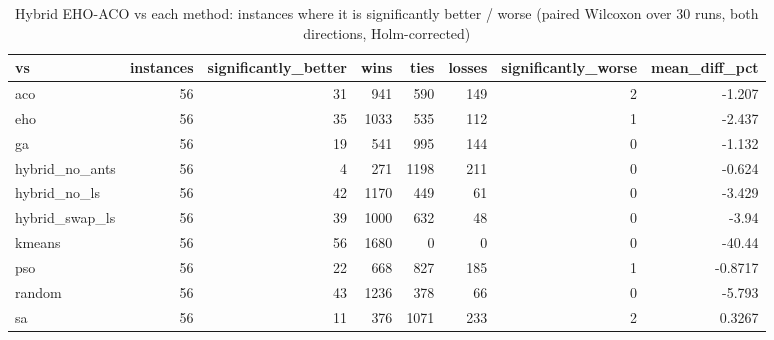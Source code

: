 \begin{table}
\caption{Hybrid EHO-ACO vs each method: instances where it is significantly better / worse (paired Wilcoxon over 30 runs, both directions, Holm-corrected)}
\begin{tabular}{lrrrrrrr}
\toprule
vs & instances & significantly_better & wins & ties & losses & significantly_worse & mean_diff_pct \\
\midrule
aco & 56 & 31 & 941 & 590 & 149 & 2 & -1.207 \\
eho & 56 & 35 & 1033 & 535 & 112 & 1 & -2.437 \\
ga & 56 & 19 & 541 & 995 & 144 & 0 & -1.132 \\
hybrid_no_ants & 56 & 4 & 271 & 1198 & 211 & 0 & -0.624 \\
hybrid_no_ls & 56 & 42 & 1170 & 449 & 61 & 0 & -3.429 \\
hybrid_swap_ls & 56 & 39 & 1000 & 632 & 48 & 0 & -3.94 \\
kmeans & 56 & 56 & 1680 & 0 & 0 & 0 & -40.44 \\
pso & 56 & 22 & 668 & 827 & 185 & 1 & -0.8717 \\
random & 56 & 43 & 1236 & 378 & 66 & 0 & -5.793 \\
sa & 56 & 11 & 376 & 1071 & 233 & 2 & 0.3267 \\
\bottomrule
\end{tabular}
\end{table}
